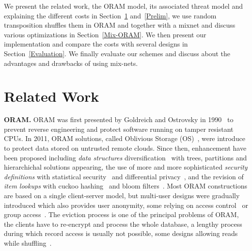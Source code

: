 \documentclass[USenglish,oneside,twocolumn]{article}
\begin{document}
We present the related work, the ORAM model, its associated threat model and explaining the different costs in Section~\ref{Related} and~\ref{Prelim}, we use random transposition shuffles them in ORAM and together with a mixnet and discuss various optimizations in Section~\ref{Mix-ORAM}. We then present our implementation and compare the costs with several designs in Section~\ref{Evaluation}.
We finally evaluate our schemes and discuss about the advantages and drawbacks of using mix-nets.
%

\section{Related Work}\label{Related}
\noindent\textbf{ORAM.}
ORAM was first presented by Goldreich and Ostrovsky in 1990~\cite{ostrovsky1990efficient} to prevent reverse engineering and protect software running on tamper resistant CPUs. In 2011, ORAM solutions, called Oblivious Storage (OS)~\cite{boneh2011}, were introduce to protect data stored on untrusted remote clouds.
Since then, enhancement have been proposed including \textit{data structures} diversification~\cite{goldreich1996software,stefanov2011towards,stefanov2013path,ren2014ring} with trees, partitions and hierarchichal solutions appearing,
the use of more and more sophisticated \textit{security definitions} with statistical security~\cite{damgaard2011perfectly,ajtai2010oblivious} and differential privacy~\cite{wagh2016root}, and the revision of \textit{item lookups} with cuckoo hashing~\cite{pinkas2010oblivious} and bloom filters~\cite{williams2008building}.
Most ORAM constructions are based on a single client-server model, but multi-user designs were gradually introduced \cite{backesanonymous}  which also provides user anonymity, some relying on access control~\cite{franz2011oblivious} or group access~\cite{goodrich2012privacy}.
The eviction process is one of the principal problems of ORAM, the clients have to re-encrypt and process the whole database, a lengthy process during which record access is usually not possible, some designs allowing reads while shuffling~\cite{boneh2011}.\\
\end{document}
